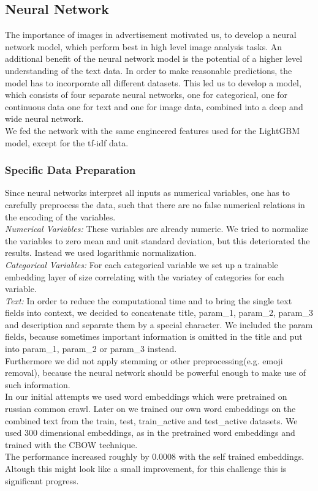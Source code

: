 \documentclass[runningheads]{llncs}
\begin{document}
\subsection{Neural Network}
 The importance of images in advertisement motivated us, to develop a neural network model, which perform best in high level image analysis tasks. An additional benefit of the neural network model is the potential of a higher level understanding of the text data. In order to make reasonable predictions, the model has to incorporate all different datasets. This led us to develop a  model, which consists of four separate neural networks, one for categorical, one for continuous data one for text and one for image data, combined into a deep and wide neural network.\\
  We fed the network with the same engineered features used for the  LightGBM model, except for the tf-idf data.
  
 \subsubsection{Specific Data Preparation}
 Since neural networks interpret all inputs as numerical variables, one has to carefully preprocess the data, such that there are no false numerical relations in the encoding of the variables. \\
 
 \textit{Numerical Variables:} These variables are already numeric. We tried to normalize the variables to zero mean and unit standard deviation, but this deteriorated the results. Instead we used logarithmic normalization.\\ 
 
 \textit{Categorical Variables:} For each categorical variable we set up a trainable embedding layer of size correlating with the variatey of categories for each variable. \\
 
 \textit{Text:} In order to reduce the computational time and to bring the single text fields into context, we decided to concatenate title, param\_1, param\_2, param\_3 and  description and separate them by a special character. We included the param fields, because sometimes important information is omitted in the title and put into param\_1, param\_2 or param\_3 instead.\\
 Furthermore we did not apply stemming or other preprocessing(e.g. emoji removal), because the neural network should be powerful enough to make use of such information.\\
 In our initial attempts we used word embeddings which were pretrained on russian common crawl. Later on we trained our own word embeddings on the combined text from the train, test, train\_active and test\_active datasets. We used 300 dimensional embeddings, as in the pretrained word embeddings and trained with the CBOW technique.\\
 The performance increased roughly by 0.0008 with the self trained embeddings. Altough this might look like a small improvement, for this challenge this is significant progress.
 
\end{document}
